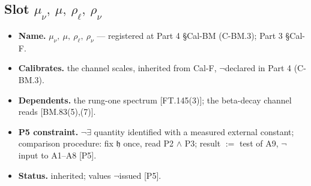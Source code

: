 \documentclass[11pt,openany]{report}
\theoremstyle{canonplain}
\theoremstyle{canondef}
\begin{document}
\subsection*{Slot $\mu_\nu,\ \mu,\ \rho_\ell,\ \rho_\nu$}
\begin{itemize}\setlength{\itemsep}{2pt}
\item \textbf{Name.} $\mu_\nu,\ \mu,\ \rho_\ell,\ \rho_\nu$ — registered at Part 4 §Cal-BM (C-BM.3); Part 3 §Cal-F.
\item \textbf{Calibrates.} the channel scales, inherited from Cal-F, $\neg$declared in Part 4 (C-BM.3).
\item \textbf{Dependents.} the rung-one spectrum [FT.145(3)]; the beta-decay channel reads [BM.83(5),(7)].
\item \textbf{P5 constraint.} $\neg\exists$ quantity identified with a measured external constant; comparison procedure: fix $\mathfrak h$ once, read P2 $\wedge$ P3; result $:=$ test of A9, $\neg$ input to A1--A8 [P5].
\item \textbf{Status.} inherited; values $\neg$issued [P5].
\end{itemize}
\end{document}
